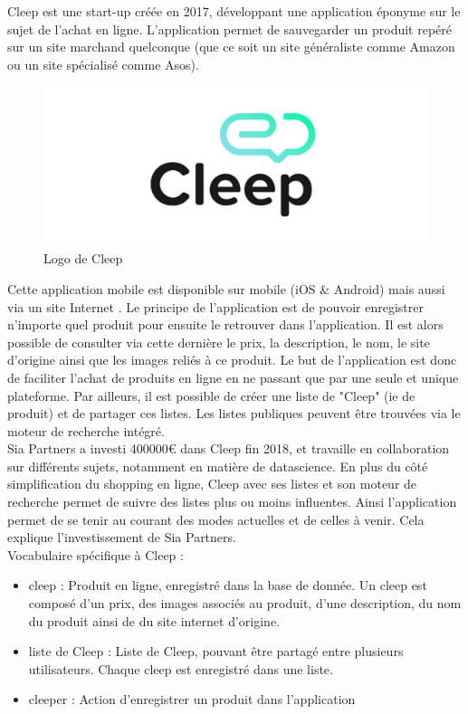\documentclass{article} %
\begin{document}
Cleep est une start-up créée en 2017, développant une application éponyme sur le sujet de l'achat en ligne. L'application permet de sauvegarder un produit repéré sur un site marchand quelconque (que ce soit un site généraliste comme Amazon ou un site spécialisé comme Asos). 
\begin{figure}
	\begin{center}
		\includegraphics[keepaspectratio = true,scale=0.2]{cleep.jpg}
	\end{center}
	\caption{Logo de Cleep}
\end{figure}
Cette application mobile est disponible sur mobile (iOS \& Android) mais aussi via un site Internet \cite{cleep}. Le principe de l'application est de pouvoir enregistrer n'importe quel produit pour ensuite le retrouver dans l'application. Il est alors possible de consulter via cette dernière le prix, la description, le nom, le site d'origine ainsi que les images reliés à ce produit. Le but de l'application est donc de faciliter l'achat de produits en ligne en ne passant que par une seule et unique plateforme. Par ailleurs, il est possible de créer une liste de "Cleep" (ie de produit) et de partager ces listes. Les listes publiques peuvent être trouvées via le moteur de recherche intégré. \\
Sia Partners a investi 400000€ dans Cleep fin 2018, et travaille en collaboration sur différents sujets, notamment en matière de datascience. En plus du côté simplification du shopping en ligne, Cleep avec ses listes et son moteur de recherche permet de suivre des listes plus ou moins influentes. Ainsi l'application permet de se tenir au courant des modes actuelles et de celles à venir. Cela explique l'investissement de Sia Partners.\\
Vocabulaire spécifique à Cleep :
\begin{itemize}
	\item cleep : Produit en ligne, enregistré dans la base de donnée. Un cleep est composé d'un prix, des images associés au produit, d'une description, du nom du produit ainsi de du site internet d'origine.
	\item liste de Cleep : Liste de Cleep, pouvant être partagé entre plusieurs utilisateurs. Chaque cleep est enregistré dans une liste.
	\item cleeper : Action d'enregistrer un produit dans l'application
\end{itemize}
\end{document}

